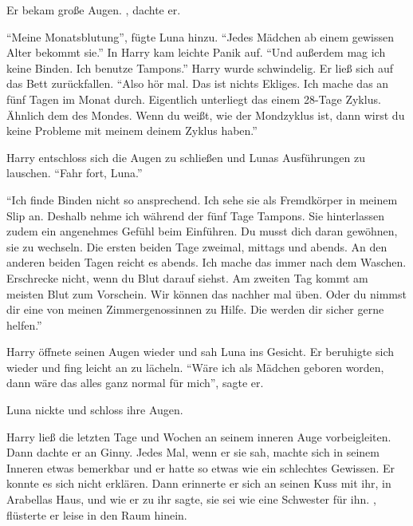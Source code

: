 Er bekam große Augen. , dachte er.

\enquote{Meine Monatsblutung}, fügte Luna hinzu. \enquote{Jedes Mädchen ab einem gewissen Alter bekommt sie.} In Harry kam leichte Panik auf. \enquote{Und außerdem mag ich keine Binden. Ich benutze Tampons.} Harry wurde schwindelig. Er ließ sich auf das Bett zurückfallen. \enquote{Also hör mal. Das ist nichts Ekliges. Ich mache das an fünf Tagen im Monat durch. Eigentlich unterliegt das einem 28-Tage Zyklus. Ähnlich dem des Mondes. Wenn du weißt, wie der Mondzyklus ist, dann wirst du keine Probleme mit meinem \gst deinem Zyklus haben.}

Harry entschloss sich die Augen zu schließen und Lunas Ausführungen zu lauschen. \enquote{Fahr fort, Luna.}

\enquote{Ich finde Binden nicht so ansprechend. Ich sehe sie als Fremdkörper in meinem Slip an. Deshalb nehme ich während der fünf Tage Tampons. Sie hinterlassen zudem ein angenehmes Gefühl beim Einführen. Du musst dich daran gewöhnen, sie zu wechseln. Die ersten beiden Tage zweimal, mittags und abends. An den anderen beiden Tagen reicht es abends. Ich mache das immer nach dem Waschen. Erschrecke nicht, wenn du Blut darauf siehst. Am zweiten Tag kommt am meisten Blut zum Vorschein. Wir können das nachher mal üben. Oder du nimmst dir eine von meinen Zimmergenossinnen zu Hilfe. Die werden dir sicher gerne helfen.}

Harry öffnete seinen Augen wieder und sah Luna ins Gesicht. Er beruhigte sich wieder und fing leicht an zu lächeln. \enquote{Wäre ich als Mädchen geboren worden, dann wäre das alles ganz normal für mich}, sagte er.

Luna nickte und schloss ihre Augen.

Harry ließ die letzten Tage und Wochen an seinem inneren Auge vorbeigleiten. Dann dachte er an Ginny. Jedes Mal, wenn er sie sah, machte sich in seinem Inneren etwas bemerkbar und er hatte so etwas wie ein schlechtes Gewissen. Er konnte es sich nicht erklären. Dann erinnerte er sich an seinen Kuss mit ihr, in Arabellas Haus, und wie er zu ihr sagte, sie sei wie eine Schwester für ihn. , flüsterte er leise in den Raum hinein.


